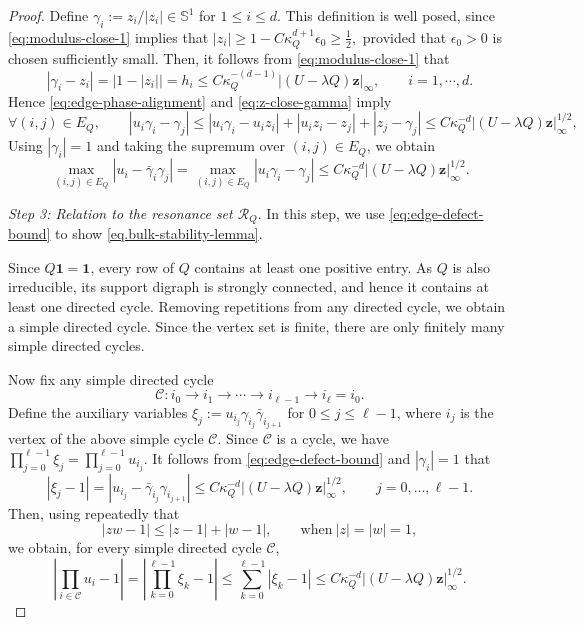 \documentclass[11pt,twoside, a4paper]{article}
\numberwithin{equation}{section}
\numberwithin{figure}{section}
\theoremstyle{plain} %
\theoremstyle{definition}
\theoremstyle{remark}
\newcommand{\1} {\mspace{1 mu}}
\newcommand{\2} {\mspace{2 mu}}
\begin{document}
\begin{proof}
Define
$
\gamma_i:=z_i/|z_i|\in\mathbb S^1
$ for $1\le i\le d$. This definition is well posed, since \eqref{eq:modulus-close-1} implies that
$
    |z_i|\ge 1-C\kappa_Q^{d+1}\epsilon_0
    \ge \frac12,
$
provided that \(\epsilon_0>0\) is chosen sufficiently small.
Then, it follows from \eqref{eq:modulus-close-1} that
\begin{equation}\label{eq:z-close-gamma}
  |\gamma_i-z_i|=\bigl|1-|z_i|\bigr|=h_i\le C\kappa_Q^{-(d-1)}|(U-\lambda Q)\mathbf z|_\infty,\qquad i=1,\cdots,d.
\end{equation}
Hence  \eqref{eq:edge-phase-alignment} and \eqref{eq:z-close-gamma} imply
\[
\forall (i,j)\in E_Q,\qquad
|u_i\gamma_i-\gamma_j|
\le |u_i\gamma_i-u_i z_i|+|u_i z_i-z_j|+|z_j-\gamma_j|
\le C\kappa_Q^{-d}|(U-\lambda Q)\mathbf z|_\infty^{1/2},
\]
Using \(|\gamma_i|=1\) and taking the supremum over \((i,j)\in E_Q\), we obtain
\begin{equation}\label{eq:edge-defect-bound}
\max_{(i,j)\in E_Q}|u_i-\bar{\gamma}_i\gamma_j|=\max_{(i,j)\in E_Q}|u_i\gamma_i-\gamma_j|
\le C\kappa_Q^{-d}|(U-\lambda Q)\mathbf z|_\infty^{1/2}.
\end{equation}

\noindent\textit{Step 3: Relation to the resonance set $\mathscr{R}_Q$}. 
In this step, we use \eqref{eq:edge-defect-bound} to show \eqref{eq.bulk-stability-lemma}.

Since $Q\mathbf 1=\mathbf 1$, every row of $Q$ contains at least one positive entry. As $Q$ is also irreducible, its support digraph is strongly connected, and hence it contains at least one directed cycle. Removing repetitions from any directed cycle, we obtain a simple directed cycle. 
Since the vertex set is finite, there are only finitely many simple directed cycles.

Now fix any simple directed cycle 
\[
\mathscr{C}: i_0\to i_1\to \cdots \to i_{\ell-1}\to i_\ell=i_0.
\]
Define the auxiliary variables
$
\xi_j:=u_{i_j}\gamma_{i_j}\bar\gamma_{i_{j+1}}
$ for $0\le j\le \ell-1$, where $i_j$ is the vertex of the above simple cycle $\mathscr{C}$.
Since $\mathscr{C}$ is a cycle, we have 
$
  \prod_{j=0}^{\ell-1}\xi_j=\prod_{j=0}^{\ell-1}u_{i_j}.
$
It follows from \eqref{eq:edge-defect-bound} and $|\gamma_i|=1$ that 
\begin{equation}
  |\xi_j-1|=|u_{i_j}-\bar{\gamma}_{i_j}\gamma_{i_{j+1}}|\le C\kappa_Q^{-d}|(U-\lambda Q)\mathbf z|_\infty^{1/2},\qquad j=0,\dots,\ell-1.
\end{equation}
Then, using repeatedly that
\[
|zw-1|\le |z-1|+|w-1|,
\qquad \mbox{when}~|z|=|w|=1,
\]
we obtain, for every simple directed cycle $\mathscr{C}$,
\begin{equation}\label{eq.u-cycle-bound}
  \left|\prod_{i\in \mathscr{C}}u_i-1\right|
=
\left|\prod_{k=0}^{\ell-1}\xi_k-1\right|
\le \sum_{k=0}^{\ell-1}|\xi_k-1|
\le C\kappa_Q^{-d}|(U-\lambda Q)\mathbf z|_\infty^{1/2}.
\end{equation}




\end{proof}
\end{document}
